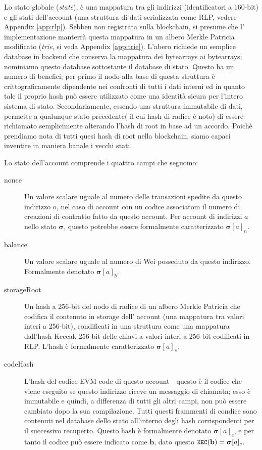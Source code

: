 \documentclass[9pt,oneside]{amsart}
\begin{document}
\begin{multicols}{2}
Lo stato globale (\textit{state}), è una mappatura tra gli indirizzi (identificatori a 160-bit) e gli stati dell'account (una struttura di dati serializzata come RLP, vedere Appendix \ref{app:rlp}). Sebben non registrata sulla blockchain, si presume che l' implementazione manterrà questa mappatura in un albero Merkle Patricia modificato (\textit{trie}, si veda Appendix \ref{app:trie}). L'abero richiede un semplice database in backend che conserva la mappatura dei bytearrays ai bytearrays; nominiamo questo database sottostante il database di stato. Questo ha un numero di benefici; per primo il nodo alla base di questa struttura è crittograficamente dipendente nei confronti di tutti i dati interni ed in quanto tale il proprio hash può essere utilizzato come una identità sicura per l'intero sistema di stato. Secondariamente, essendo una struttura immutabile di dati, permette a qualunque stato precedente( il cui hash di radice è noto) di essere richiamato semplicimente alterando l'hash di root in base ad un accordo. Poichè prendiamo nota di tutti quesi hash di root nella blockchain, siamo capaci inventire in maniera banale i vecchi stati.

Lo stato dell'account comprende i quattro campi che seguomo:

\begin{description}
\item[nonce] Un valore scalare uguale al numero delle transazioni spedite da questo indirizzo o, nel caso di account con un codice associatom il numero di creazioni di contratto fatto da questo account. Per account di indirizzi $a$ nello stato $\boldsymbol{\sigma}$, questo potrebbe essere formalmente caratterizzato $\boldsymbol{\sigma}[a]_n$.
\item[balance] Un valore scalare uguale al numero di Wei posseduto da questo indirizzo. Formalmente denotato $\boldsymbol{\sigma}[a]_b$.
\item[storageRoot] Un hash a  256-bit del nodo di radice di un albero Merkle Patricia che codifica il contenuto in storage dell' account (una mappatura tra valori interi a 256-bit), condificati in una struttura come una mappatura dall'hash Keccak 256-bit delle chiavi a valori interi a 256-bit codificati in RLP. L'hash è formalmente caratterizzato $\boldsymbol{\sigma}[a]_s$.
\item[codeHash] L'hash del codice EVM code di questo account---questo è il codice che viene eseguito se questo indirizzo riceve un messaggio di chiamata; esso è immutabile e quindi, a differenza di tutti gli altri campi, non può essere cambiato dopo la sua compilazione. Tutti questi frammenti di condice sono contenuti nel database dello stato all'interno degli hash corrispondenti per il successivo recuperto. Questo hash è formalmente denotato $\boldsymbol{\sigma}[a]_c$, e per tanto il codice può essere indicato come $\mathbf{b}$, dato questo $\texttt{\small KEC}(\mathbf{b}) = \boldsymbol{\sigma}[a]_c$.
\end{description}


\end{multicols}
\end{document}
